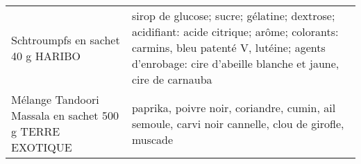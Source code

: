 \begin{longtable}{p{5cm}p{10cm}}
                                                                        Schtroumpfs en sachet 40 g HARIBO &                                                                                                                                                                                                                                                                                                                                                                                                                                                                                                                                                                                                                                                                                                                                                                                                                                        sirop de glucose; sucre; gélatine; dextrose; acidifiant: acide citrique; arôme; colorants: carmins, bleu patenté V, lutéine; agents d'enrobage: cire d'abeille blanche et jaune, cire de carnauba \\
                                                  Mélange Tandoori Massala en sachet 500 g TERRE EXOTIQUE &                                                                                                                                                                                                                                                                                                                                                                                                                                                                                                                                                                                                                                                                                                                                                                                                                                                                                                                                       paprika, poivre noir, coriandre, cumin, ail semoule, carvi noir cannelle, clou de girofle, muscade \\

\end{longtable}

